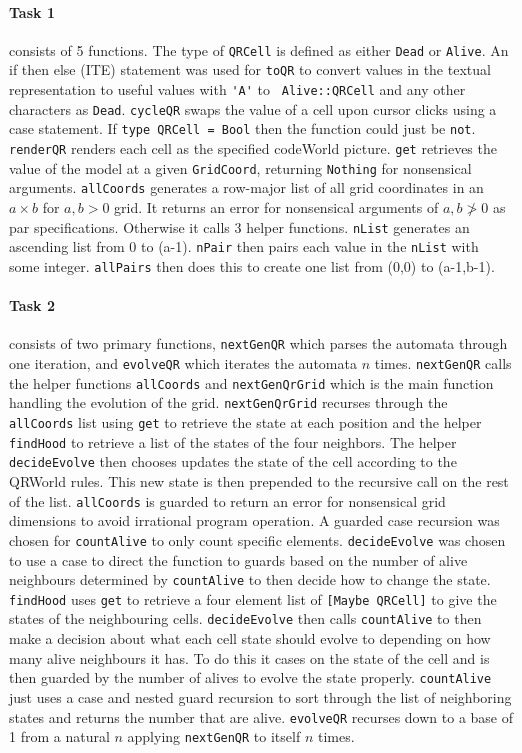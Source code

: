 \documentclass[11pt]{article}
\begin{document}
\paragraph{Task 1} consists of 5 functions. The type of \verb|QRCell| is defined as either \verb|Dead| or \verb|Alive|. An if then else (ITE) statement was used for \verb|toQR| to convert values in the textual representation to useful values with \verb|'A'| to \verb| Alive::QRCell| and any other characters as \verb|Dead|.  \verb|cycleQR| swaps the value of a cell upon cursor clicks using a case statement.  If \verb|type QRCell = Bool| then the function could just be \verb|not|. \verb|renderQR| renders each cell as the specified codeWorld picture.  \verb|get| retrieves the value of the model at a given \verb|GridCoord|, returning \verb|Nothing| for nonsensical arguments. \verb|allCoords| generates a row-major list of all grid coordinates in an $a\times b$ for $a,b>0$ grid.  It returns an error for nonsensical arguments of $a,b\not>0$ as par specifications. Otherwise it calls 3 helper functions. \verb|nList| generates an ascending list from 0 to (a-1). \verb|nPair| then pairs each value in the \verb|nList| with some integer. \verb|allPairs| then does this to create one list from (0,0) to (a-1,b-1). 

\paragraph{Task 2} consists of two primary functions, \verb|nextGenQR| which parses the automata through one iteration, and \verb|evolveQR| which iterates the automata $n$ times. \verb|nextGenQR| calls the helper functions \verb|allCoords| and \verb|nextGenQrGrid| which is the main function handling the evolution of the grid. \verb|nextGenQrGrid| recurses through the \verb|allCoords| list using \verb|get| to retrieve the state at each position and the helper \verb|findHood| to retrieve a list of the states of the four neighbors. The helper \verb|decideEvolve| then chooses updates the state of the cell according to the QRWorld rules. This new state is then prepended to the recursive call on the rest of the list.  \verb|allCoords| is guarded to return an error for nonsensical grid dimensions to avoid irrational program operation. A guarded case recursion was chosen for \verb|countAlive| to only count specific elements. \verb|decideEvolve| was chosen to use a case to direct the function to guards based on the number of alive neighbours determined by \verb|countAlive| to then decide how to change  the state. \verb|findHood| uses \verb|get| to retrieve a four element list of \verb|[Maybe QRCell]| to give the states of the neighbouring cells. \verb|decideEvolve| then calls \verb|countAlive| to then make a decision about what each cell state should evolve to depending on how many alive neighbours it has. To do this it cases on the state of the cell and is then guarded by the number of alives to evolve the state properly. \verb|countAlive| just uses a case and nested guard recursion to sort through the list of neighboring states and returns the number that are alive. \verb|evolveQR| recurses down to a base of 1 from a natural $n$ applying \verb|nextGenQR| to itself $n$ times.
\end{document}
